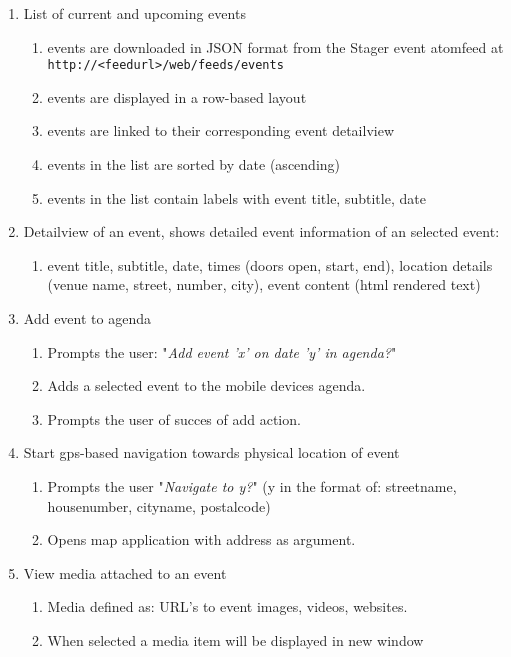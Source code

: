 \begin{enumerate}
\item
	List of current and upcoming events
	\begin{enumerate}
		\item events are downloaded in JSON format from the Stager event atomfeed at \texttt{http://<feedurl>/web/feeds/events}
		\item events are displayed in a row-based layout
		\item events are linked to their corresponding event detailview
		\item events in the list are sorted by date (ascending)
		\item events in the list contain labels with event title, subtitle, date
	\end{enumerate}
\item
Detailview of an event, shows detailed event information of an selected event:
\begin{enumerate}
	\item event title, subtitle, date, times (doors open, start, end), location details (venue name, street, number, city), event content (html rendered text)
\end{enumerate}
\item
Add event to agenda
\begin{enumerate}
	\item Prompts the user: "\emph{Add event 'x' on date 'y' in agenda?}"
	\item Adds a selected event to the mobile devices agenda.
	\item Prompts the user of succes of add action.
\end{enumerate}
\item
Start gps-based navigation towards physical location of event
\begin{enumerate}
	\item Prompts the user "\emph{Navigate to y?}" (y in the format of: streetname, housenumber, cityname, postalcode)
	\item Opens map application with address as argument.
\end{enumerate}
\item
View media attached to an event
\begin{enumerate}
	\item Media defined as: URL's to event images, videos, websites.
	\item When selected a media item will be displayed in new window
\end{enumerate}

\end{enumerate}

